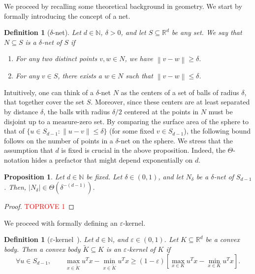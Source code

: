 \documentclass[11pt]{article}
\newtheorem{definition}[theorem]{Definition}
\newtheorem{proposition}[theorem]{Proposition}
\newcommand{\N}{\ensuremath{\mathbb{N}}}
\newcommand{\R}{\ensuremath{\mathbb{R}}}
\newcommand{\norm}[1]{\ensuremath{\left\|#1\right\|}}
\begin{document}
    We proceed by recalling some theoretical background in geometry. We start by formally introducing the concept of a net.

    \begin{definition}[$\delta$-net]
        Let $d \in \N$, $\delta > 0$, and let $S \subseteq \R^d$ be any set. We say that $N \subseteq S$ is a $\delta$-net of $S$ if
        \begin{enumerate}[nosep]
            \item For any two distinct points $v,w \in N$, we have $\norm{v-w} \geq \delta$.
            \item For any $v \in S$, there exists a $w \in N$ such that $\norm{v - w} \leq \delta$.
        \end{enumerate}
    \end{definition}

    Intuitively, one can think of a $\delta$-net $N$ as the centers of a set of balls of radius $\delta$, that together cover the set $S$. Moreover, since these centers are at least separated by distance $\delta$, the balls with radius $\delta/2$ centered at the points in $N$ must be disjoint up to a measure-zero set. By comparing the surface area of the sphere to that of $\{u \in S_{d-1}: \|u-v\| \leq \delta\}$ (for some fixed $v \in S_{d-1}$), the following bound follows on the number of points in a $\delta$-net on the sphere. We stress that the assumption that $d$ is fixed is crucial in the above proposition. Indeed, the $\Theta$-notation hides a prefactor that might depend exponentially on $d$.

    \begin{proposition}
        \label{lem:num-patches-lb}
        Let $d \in \N$ be fixed. Let $\delta \in (0,1)$, and let $N_{\delta}$ be a $\delta$-net of $S_{d-1}$. Then, $|N_{\delta}| \in \Theta(\delta^{-(d-1)})$.
    \end{proposition}

    \begin{proof}\textcolor{red}{TOPROVE 1}\end{proof}

    We proceed with formally defining an $\varepsilon$-kernel.

    \begin{definition}[$\varepsilon$-kernel~{\cite{agarwal2004approximating}}]
        \label{def:eps-kernel}
        Let $d \in \N$, and $\varepsilon \in (0,1)$. Let $K \subseteq \R^d$ be a convex body. Then a convex body $\widetilde{K} \subseteq K$ is an $\varepsilon$-kernel of $K$ if
        \[\forall u \in S_{d-1}, \qquad \max_{x \in \widetilde{K}} u^Tx - \min_{x \in \widetilde{K}} u^Tx \geq (1-\varepsilon)\left[\max_{x \in K} u^Tx - \min_{x \in K} u^Tx\right].\]
    \end{definition}
\end{document}

